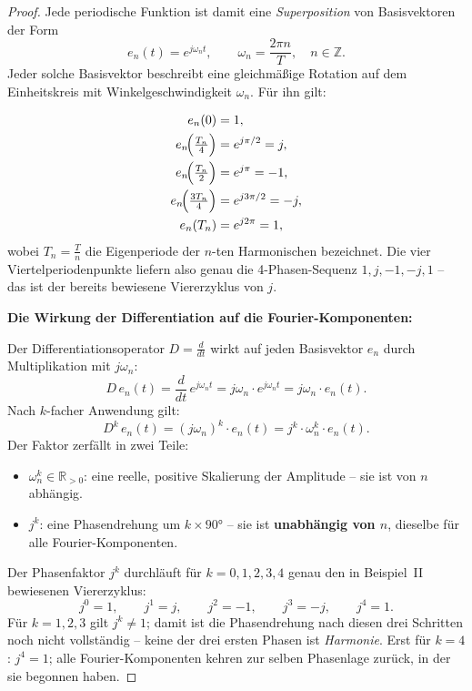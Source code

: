 ﻿\documentclass[a4paper,12pt]{article}
\theoremstyle{definition}
\begin{document}
\begin{proof}
Jede periodische Funktion ist damit eine \textit{Superposition} von Basisvektoren
der Form
\begin{equation}
	e_n(t) = e^{j\omega_n t}, \qquad \omega_n = \frac{2\pi n}{T}, \quad n \in \mathbb{Z}.
\end{equation}
Jeder solche Basisvektor beschreibt eine gleichmäßige Rotation auf dem Einheitskreis
mit Winkelgeschwindigkeit $\omega_n$. Für ihn gilt:

\begin{align*}
	e_n(0) &= 1, \\
	e_n\!\Bigl(\tfrac{T_n}{4}\Bigr) &= e^{j\pi/2} = j, \\
	e_n\!\Bigl(\tfrac{T_n}{2}\Bigr) &= e^{j\pi} = -1, \\
	e_n\!\Bigl(\tfrac{3T_n}{4}\Bigr) &= e^{j3\pi/2} = -j, \\
	e_n(T_n) &= e^{j2\pi} = 1,
\end{align*}
wobei $T_n = \tfrac{T}{n}$ die Eigenperiode der $n$-ten Harmonischen bezeichnet.
Die vier Viertelperiodenpunkte liefern also genau die 4-Phasen-Sequenz
$1, j, -1, -j, 1$ -- das ist der bereits bewiesene Viererzyklus von $j$.

\medskip
\textbf{Die Wirkung der Differentiation auf die Fourier-Komponenten:}

Der Differentiationsoperator $D = \tfrac{d}{dt}$ wirkt auf jeden Basisvektor $e_n$
durch Multiplikation mit $j\omega_n$:
\begin{equation}
	D\, e_n(t) = \frac{d}{dt}\, e^{j\omega_n t} = j\omega_n \cdot e^{j\omega_n t}
	= j\omega_n \cdot e_n(t).
\end{equation}
Nach $k$-facher Anwendung gilt:
\begin{equation}
	D^k\, e_n(t) = (j\omega_n)^k \cdot e_n(t) = j^k \cdot \omega_n^k \cdot e_n(t).
\end{equation}
Der Faktor zerfällt in zwei Teile:
\begin{itemize}
	\item $\omega_n^k \in \mathbb{R}_{>0}$: eine reelle, positive Skalierung der
	      Amplitude -- sie ist von $n$ abhängig.
	\item $j^k$: eine Phasendrehung um $k \times 90 °$ -- sie ist \textbf{unabhängig
	      von $n$}, dieselbe für alle Fourier-Komponenten.
\end{itemize}
Der Phasenfaktor $j^k$ durchläuft für $k = 0, 1, 2, 3, 4$ genau den in Beispiel~II
bewiesenen Viererzyklus:
\begin{equation}
	j^0 = 1, \qquad j^1 = j, \qquad j^2 = -1, \qquad j^3 = -j, \qquad j^4 = 1.
\end{equation}
Für $k = 1, 2, 3$ gilt $j^k \neq 1$; damit ist die Phasendrehung nach diesen
drei Schritten noch nicht vollständig -- keine der drei ersten Phasen ist
\textit{Harmonie}. Erst für $k = 4$: $j^4 = 1$; alle Fourier-Komponenten
kehren zur selben Phasenlage zurück, in der sie begonnen haben.


\end{proof}
\end{document}
